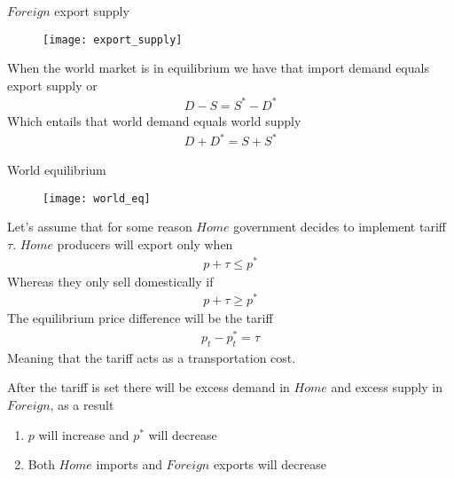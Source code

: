 \documentclass{beamer}
\begin{document}
\begin{frame}{$Foreign$ export supply}
  \begin{figure}
    \texttt{[image: export\_supply]}
  \end{figure}  
\end{frame}

\begin{frame}
  When the world market is in equilibrium we have that import demand equals export supply or
  \begin{align*}
    D-S=S^*-D^*
  \end{align*}
  Which entails that world demand equals world supply
  \begin{align*}
    D+D^*=S+S^*
  \end{align*}
\end{frame}

\begin{frame}{World equilibrium}
  \begin{figure}
    \texttt{[image: world\_eq]}
  \end{figure}
\end{frame}

\begin{frame}
Let's assume that for some reason $Home$ government decides to implement tariff $\tau$. 
$Home$ producers will export only when  
  \begin{align*}
    p +\tau \leq p^*
  \end{align*}
  \medskip
  Whereas they only sell domestically if
  \begin{align*}
    p +\tau \geq p^*
  \end{align*}
  \medskip
  The equilibrium price difference will be the tariff
  \begin{align*}
    p_t-p_t^*=\tau
  \end{align*}
  \medskip
  Meaning that the tariff acts as a transportation cost.   
\end{frame}


\begin{frame}
  After the tariff is set there will be excess demand in $Home$ and excess supply in $Foreign$, as a result
  \begin{enumerate}
    \item $p$ will increase and $p^*$ will decrease
    \item Both $Home$ imports and $Foreign$ exports will decrease
  \end{enumerate}  
\end{frame}
\end{document}
